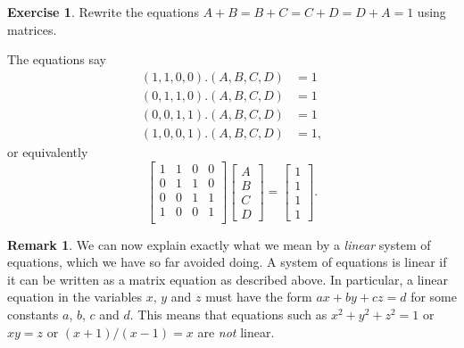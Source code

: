 \documentclass[a4paper]{book}
\newcommand{\RED}[1]{{\color{red}#1}}
\newcommand{\PURPLE}[1]{{\color{purple}#1}}
\renewcommand{\:}{\colon}
\newcommand{\EMPH}[1]{\RED{\emph{#1}}}
\newcommand{\DEFN}[1]{\PURPLE{\emph{#1}}}
\theoremstyle{definition}
\newtheorem{remark}[theorem]{Remark}
\newtheorem{exercise}[theorem]{Exercise}
\renewenvironment{solution}{\SolutionInline}{\endSolutionInline}
\begin{document}
\begin{exercise}
 Rewrite the equations $A+B=B+C=C+D=D+A=1$ using matrices.
\end{exercise}
\begin{solution}
 The equations say
 \begin{align*}
  (1,1,0,0).(A,B,C,D) &= 1 \\ 
  (0,1,1,0).(A,B,C,D) &= 1 \\ 
  (0,0,1,1).(A,B,C,D) &= 1 \\ 
  (1,0,0,1).(A,B,C,D) &= 1,
 \end{align*}
 or equivalently
 \[ \begin{bmatrix}
     1&1&0&0 \\
     0&1&1&0 \\
     0&0&1&1 \\
     1&0&0&1 \\
    \end{bmatrix}
    \begin{bmatrix}
     A \\ B \\ C \\ D
    \end{bmatrix} = 
    \begin{bmatrix}
     1 \\ 1 \\ 1 \\ 1
    \end{bmatrix}.
 \]
\end{solution}

\begin{remark}
 We can now explain exactly what we mean by a \DEFN{linear} system of
 equations, which we have so far avoided doing.  A system of equations
 is linear if it can be written as a matrix equation as described
 above.  In particular, a linear equation in the variables $x$, $y$
 and $z$ must have the form $ax+by+cz=d$ for some constants $a$, $b$,
 $c$ and $d$.  This means that equations such as $x^2+y^2+z^2=1$ or
 $xy=z$ or $(x+1)/(x-1)=x$ are \EMPH{not} linear.
\end{remark}
\end{document}

